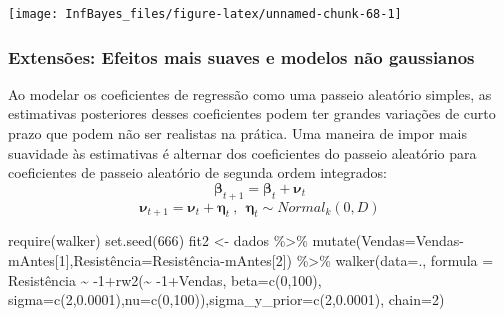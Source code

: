 \documentclass[
]{book}
\newenvironment{Shaded}{\begin{snugshade}}{\end{snugshade}}
\newcommand{\AttributeTok}[1]{\textcolor[rgb]{0.77,0.63,0.00}{#1}}
\newcommand{\DecValTok}[1]{\textcolor[rgb]{0.00,0.00,0.81}{#1}}
\newcommand{\FloatTok}[1]{\textcolor[rgb]{0.00,0.00,0.81}{#1}}
\newcommand{\FunctionTok}[1]{\textcolor[rgb]{0.00,0.00,0.00}{#1}}
\newcommand{\NormalTok}[1]{#1}
\newcommand{\OtherTok}[1]{\textcolor[rgb]{0.56,0.35,0.01}{#1}}
\newcommand{\SpecialCharTok}[1]{\textcolor[rgb]{0.00,0.00,0.00}{#1}}
\begin{document}
\begin{center}\texttt{[image: InfBayes\_files/figure-latex/unnamed-chunk-68-1]} \end{center}

\hypertarget{extensuxf5es-efeitos-mais-suaves-e-modelos-nuxe3o-gaussianos}{%
\subsubsection{Extensões: Efeitos mais suaves e modelos não gaussianos}\label{extensuxf5es-efeitos-mais-suaves-e-modelos-nuxe3o-gaussianos}}

Ao modelar os coeficientes de regressão como uma passeio aleatório simples, as estimativas posteriores desses coeficientes podem ter grandes variações de curto prazo que podem não ser realistas na prática. Uma maneira de impor mais suavidade às estimativas é alternar dos coeficientes do passeio aleatório para coeficientes de passeio aleatório de segunda ordem integrados:
\[\boldsymbol\beta_{t+1} = \boldsymbol\beta_t + \boldsymbol\nu_t\]
\[\boldsymbol\nu_{t+1} = \boldsymbol\nu_t + \boldsymbol\eta_t ~,~~ \boldsymbol\eta_t \sim \textit{Normal}_k(0,D)\]

\begin{Shaded}
\begin{Highlighting}[]
\FunctionTok{require}\NormalTok{(walker)}
\FunctionTok{set.seed}\NormalTok{(}\DecValTok{666}\NormalTok{)}
\NormalTok{fit2 }\OtherTok{\textless{}{-}}\NormalTok{ dados }\SpecialCharTok{\%\textgreater{}\%} 
  \FunctionTok{mutate}\NormalTok{(}\AttributeTok{Vendas=}\NormalTok{Vendas}\SpecialCharTok{{-}}\NormalTok{mAntes[}\DecValTok{1}\NormalTok{],Resistência}\OtherTok{=}\NormalTok{Resistência}\SpecialCharTok{{-}}\NormalTok{mAntes[}\DecValTok{2}\NormalTok{]) }\SpecialCharTok{\%\textgreater{}\%}
  \FunctionTok{walker}\NormalTok{(}\AttributeTok{data=}\NormalTok{., }\AttributeTok{formula =}\NormalTok{ Resistência }\SpecialCharTok{\textasciitilde{}} \SpecialCharTok{{-}}\DecValTok{1}\SpecialCharTok{+}\FunctionTok{rw2}\NormalTok{(}\SpecialCharTok{\textasciitilde{}} \SpecialCharTok{{-}}\DecValTok{1}\SpecialCharTok{+}\NormalTok{Vendas, }\AttributeTok{beta=}\FunctionTok{c}\NormalTok{(}\DecValTok{0}\NormalTok{,}\DecValTok{100}\NormalTok{),}
        \AttributeTok{sigma=}\FunctionTok{c}\NormalTok{(}\DecValTok{2}\NormalTok{,}\FloatTok{0.0001}\NormalTok{),}\AttributeTok{nu=}\FunctionTok{c}\NormalTok{(}\DecValTok{0}\NormalTok{,}\DecValTok{100}\NormalTok{)),}\AttributeTok{sigma\_y\_prior=}\FunctionTok{c}\NormalTok{(}\DecValTok{2}\NormalTok{,}\FloatTok{0.0001}\NormalTok{), }\AttributeTok{chain=}\DecValTok{2}\NormalTok{)}
\end{Highlighting}
\end{Shaded}
\end{document}
